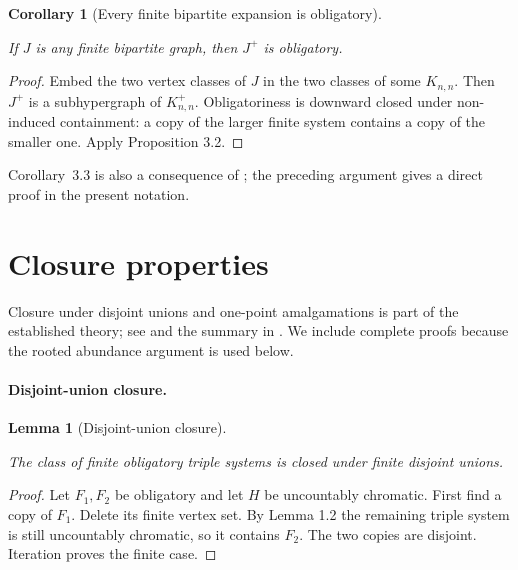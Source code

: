 \documentclass[a4paper,11pt,reqno]{amsart}
\theoremstyle{plain}
\newtheorem{lemma}[theorem]{Lemma}
\newtheorem{corollary}[theorem]{Corollary}
\theoremstyle{definition}
\theoremstyle{remark}
\begin{document}
\begin{corollary}[Every finite bipartite expansion is obligatory]\label{corollary-3.3-every-finite-bipartite-expansion-is-obligatory}

If \(J\) is any finite bipartite graph, then \(J^+\) is obligatory.

\end{corollary}
\begin{proof}
Embed the two vertex classes of \(J\) in the two classes of some \(K_{n,n}\). Then \(J^+\) is a subhypergraph of \(K_{n,n}^+\). Obligatoriness is downward closed under non-induced containment: a copy of the larger finite system contains a copy of the smaller one. Apply Proposition 3.2.
\end{proof}

Corollary~3.3 is also a consequence of
\citet[Theorem~1.2]{reiher2024}; the preceding argument gives a direct proof
in the present notation.

\section{Closure properties}\label{closure-of-obligatoriness-under-the-operations-defining-mathcal-b}

Closure under disjoint unions and one-point amalgamations is part of the
established theory; see \citet[pp.~233--238]{komjath2001} and the summary in
\citet[p.~1]{reiher2024}. We include complete proofs because the rooted
abundance argument is used below.

\paragraph{Disjoint-union closure.}\label{disjoint-union-closure}

\begin{lemma}[Disjoint-union closure]\label{lemma-4.1-disjoint-union-closure}

The class of finite obligatory triple systems is closed under finite disjoint unions.

\end{lemma}
\begin{proof}
Let \(F_1,F_2\) be obligatory and let \(H\) be uncountably chromatic. First find a copy of \(F_1\). Delete its finite vertex set. By Lemma 1.2 the remaining triple system is still uncountably chromatic, so it contains \(F_2\). The two copies are disjoint. Iteration proves the finite case.
\end{proof}
\end{document}
